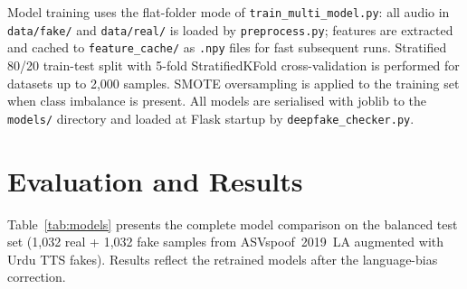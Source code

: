 \documentclass[10pt,twocolumn]{article}
\begin{document}
Model training uses the flat-folder mode of \texttt{train\_multi\_model.py}: all
audio in \texttt{data/fake/} and \texttt{data/real/} is loaded by
\texttt{preprocess.py}; features are extracted and cached to
\texttt{feature\_cache/} as \texttt{.npy} files for fast subsequent runs.
Stratified 80/20 train-test split with 5-fold StratifiedKFold cross-validation
is performed for datasets up to 2,000 samples. SMOTE oversampling is applied to
the training set when class imbalance is present. All models are serialised with
joblib to the \texttt{models/} directory and loaded at Flask startup by
\texttt{deepfake\_checker.py}.

\section{Evaluation and Results}

Table~\ref{tab:models} presents the complete model comparison on the balanced
test set (1,032 real + 1,032 fake samples from ASVspoof~2019~LA augmented with
Urdu TTS fakes). Results reflect the retrained models after the language-bias
correction.
\end{document}
